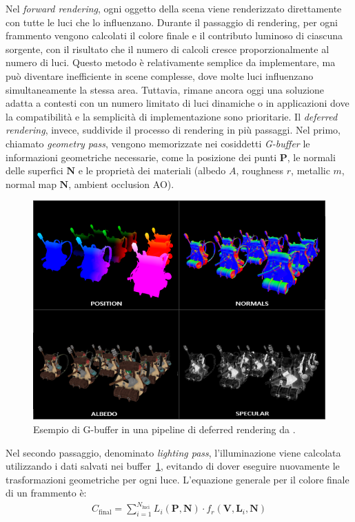\documentclass[12pt,a4paper,openright,twoside]{book}
\begin{document}
Nel \emph{forward rendering}, ogni oggetto della scena viene renderizzato direttamente con tutte le luci che lo influenzano.
Durante il passaggio di rendering, per ogni frammento vengono calcolati il colore finale e il contributo luminoso
di ciascuna sorgente, con il risultato che il numero di calcoli cresce proporzionalmente al numero di luci.
Questo metodo è relativamente semplice da implementare, ma può diventare inefficiente in scene complesse, dove molte
luci influenzano simultaneamente la stessa area. Tuttavia, rimane ancora oggi una soluzione adatta a contesti con un
numero limitato di luci dinamiche o in applicazioni dove la compatibilità e la semplicità di implementazione sono prioritarie.
Il \emph{deferred rendering}, invece, suddivide il processo di rendering in più passaggi. Nel primo, chiamato
\emph{geometry pass}, vengono memorizzate nei cosiddetti \emph{G-buffer} le informazioni geometriche necessarie,
come la posizione dei punti \(\mathbf{P}\), le normali delle superfici \(\mathbf{N}\) e le proprietà dei materiali
(albedo \(A\), roughness \(r\), metallic \(m\), normal map \(\mathbf{N}\), ambient occlusion AO).
\begin{figure}[H]
   \centering
   \includegraphics[width=.8\linewidth]{figures/g_buffer_example.png}
   \caption{Esempio di G-buffer in una pipeline di deferred rendering da \cite{learnopengl}.}
   \label{fig:g-buffer-example}
\end{figure}
Nel secondo passaggio, denominato \emph{lighting pass}, l'illuminazione viene calcolata utilizzando i dati salvati
nei buffer~\ref{fig:g-buffer-example}, evitando di dover eseguire nuovamente le trasformazioni geometriche per ogni
luce. L'equazione generale per il colore finale di un frammento è:
\begin{align*}
C_{\text{final}} = \sum_{i=1}^{N_\text{luci}} L_i(\mathbf{P}, \mathbf{N}) \cdot f_r(\mathbf{V}, \mathbf{L}_i, \mathbf{N})
\end{align*}
\end{document}
